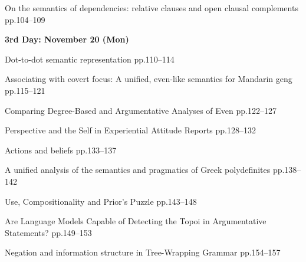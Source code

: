 \documentclass[12pt]{jarticle}
\begin{document}
     {On the semantics of dependencies: relative clauses and open clausal complements}
     {pp.104--109}







\noindent\textbf{\large 
3rd Day: November 20 (Mon)
}\\







  
     {Dot-to-dot semantic representation}
     {pp.110--114}
  
     {Associating with covert focus: A unified, even-like semantics for Mandarin geng}
     {pp.115--121}
  
     {Comparing Degree-Based and Argumentative Analyses of Even}
     {pp.122--127}




  
     {Perspective and the Self in Experiential Attitude Reports}
     {pp.128--132}
  
     {Actions and beliefs}
     {pp.133--137}
  
     {A unified analysis of the semantics and pragmatics of Greek polydefinites}
     {pp.138--142}







  
     {Use, Compositionality and Prior's Puzzle}
     {pp.143--148}
  
     {Are Language Models Capable of Detecting the Topoi in Argumentative Statements?}
     {pp.149--153}
  
     {Negation and information structure in Tree-Wrapping Grammar}
     {pp.154--157}



\end{document}
